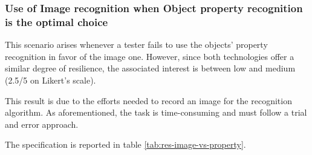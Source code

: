     \subsubsection{Use of Image recognition when Object property recognition is the optimal choice}

     \label{sec:disc-rq3-wrong-technique-3}
    This scenario arises whenever a tester fails to use the objects' property recognition in favor of the image one. However, since both technologies offer a similar degree of resilience, the associated interest is between low and medium (2.5/5 on Likert's scale).

    This result is due to the efforts needed to record an image for the recognition algorithm. As aforementioned, the task is time-consuming and must follow a trial and error approach.

    The specification is reported in table \ref{tab:res-image-vs-property}.

